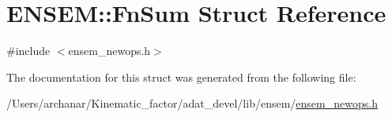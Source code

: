 \hypertarget{structENSEM_1_1FnSum}{}\section{E\+N\+S\+EM\+:\+:Fn\+Sum Struct Reference}
\label{structENSEM_1_1FnSum}


{\ttfamily \#include $<$ensem\+\_\+newops.\+h$>$}



The documentation for this struct was generated from the following file\+:\begin{DoxyCompactItemize}
\item 
/\+Users/archanar/\+Kinematic\+\_\+factor/adat\+\_\+devel/lib/ensem/\mbox{\hyperlink{lib_2ensem_2ensem__newops_8h}{ensem\+\_\+newops.\+h}}\end{DoxyCompactItemize}
